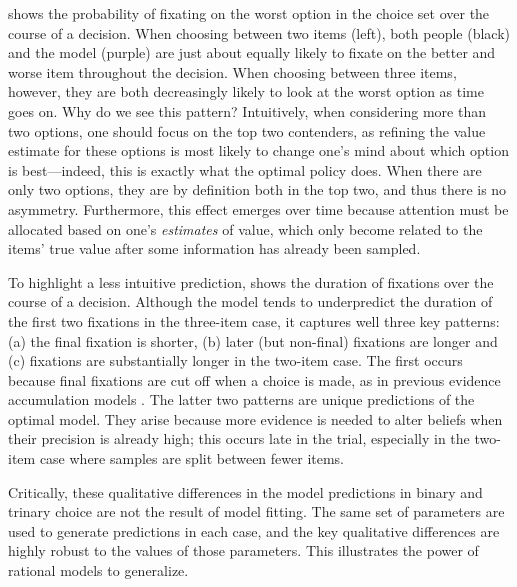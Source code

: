 \documentclass[dsingle]{memo}
\begin{document}
 shows the probability of fixating on the worst option in the choice set over the course of a decision. When choosing between two items (left), both people (black) and the model (purple) are just about equally likely to fixate on the better and worse item throughout the decision. When choosing between three items, however, they are both decreasingly likely to look at the worst option as time goes on. Why do we see this pattern? Intuitively, when considering more than two options, one should focus on the top two contenders, as refining the value estimate for these options is most likely to change one's mind about which option is best---indeed, this is exactly what the optimal policy does. When there are only two options, they are by definition both in the top two, and thus there is no asymmetry. Furthermore, this effect emerges over time because attention must be allocated based on one's \emph{estimates} of value, which only become related to the items' true value after some information has already been sampled. 


To highlight a less intuitive prediction,  shows the duration of fixations over the course of a decision. Although the model tends to underpredict the duration of the first two fixations in the three-item case, it captures well three key patterns: (a) the final fixation is shorter, (b) later (but non-final) fixations are longer and (c) fixations are substantially longer in the two-item case. The first occurs because final fixations are cut off when a choice is made, as in previous evidence accumulation models \citep{krajbich2010visual}. The latter two patterns are unique predictions of the optimal model. They arise because more evidence is needed to alter beliefs when their precision is already high; this occurs late in the trial, especially in the two-item case where samples are split between fewer items.

Critically, these qualitative differences in the model predictions in binary and trinary choice are not the result of model fitting. The same set of parameters are used to generate predictions in each case, and the key qualitative differences are highly robust to the values of those parameters. This illustrates the power of rational models to generalize.
\end{document}
